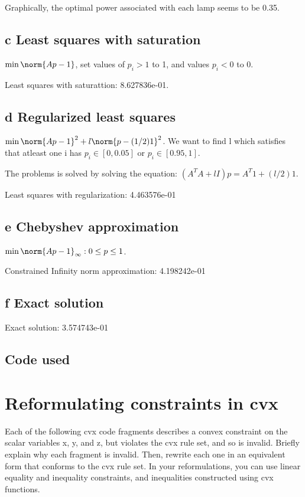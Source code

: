\documentclass{article}
\begin{document}
Graphically, the optimal power associated with each lamp seems to be 0.35.

\subsection{c Least squares with saturation}
$\min \norm{Ap - 1}$, set values of $p_i >1$ to 1, and values $p_i<0$ to 0.

Least squares with saturattion: 8.627836e-01.

\subsection{d Regularized least squares}
$\min \norm{Ap - 1}^{2} + l \norm{p - (1/2)1}^{2}$. We want to find l which satisfies that atleast one i has $p_i \in [0, 0.05]$ or $p_i \in [0.95, 1]$.

The problems is solved by solving the equation: $(A^{T}A+lI)p = A^{T}1+(l/2) 1$.

Least squares with regularization: 4.463576e-01


\subsection{e Chebyshev approximation}
$\min \norm{Ap -1}_\infty : 0 \leq p \leq 1$.

Constrained Infinity norm approximation: 4.198242e-01


\subsection{f Exact solution}
Exact solution: 3.574743e-01

\subsection{Code used}



\section{Reformulating constraints in cvx}
Each of the following cvx code fragments describes a convex constraint on the scalar variables x, y, and z, but violates the cvx rule set, and so is invalid. Briefly explain why each fragment is invalid. Then, rewrite each one in an equivalent form that conforms to the cvx rule set. In your reformulations, you can use linear equality and inequality constraints, and inequalities constructed using cvx functions.
\end{document}
